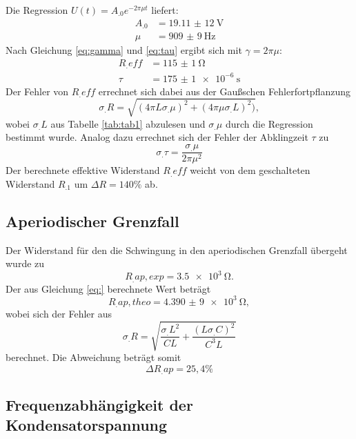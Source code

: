 \newpage
\noindent Die Regression $U(t)=A_.0e^{-2\pi\mu t}$ liefert:
\begin{align}
A_.0 &= \SI{19,11(12)}{\volt} \\
\mu &= \SI{909(9)}{\hertz}
\end{align}
Nach Gleichung \eqref{eq:gamma} und \eqref{eq:tau} ergibt sich mit $\gamma=2\pi\mu$:
\begin{align}
R_.{eff}&=\SI{115(1)}{\ohm} \\
\tau &=\SI{175(1)e-6}{\second}
\end{align}
Der Fehler von $R_.{eff}$ errechnet sich dabei aus der Gaußschen Fehlerfortpflanzung
\[
\sigma_.R=\sqrt{\left(4\pi L\sigma_.{\mu}\right)^2 +\left(4\pi\mu\sigma_.L\right)^2)},
\]
wobei $\sigma_.L$ aus Tabelle \ref{tab:tab1} abzulesen und $\sigma_.{\mu}$ durch die Regression bestimmt wurde.
Analog dazu errechnet sich der Fehler der Abklingzeit $\tau$ zu
\[
\sigma_.{\tau}=\frac{\sigma_.{\mu}}{2\pi\mu^2}
\]
Der berechnete effektive Widerstand $R_.{eff}$ weicht von dem geschalteten Widerstand $R_.1$ um $\Delta R=140\%$ ab.
\subsection{Aperiodischer Grenzfall}
Der Widerstand für den die Schwingung in den aperiodischen Grenzfall übergeht wurde zu
\[
R_.{ap,exp}=\SI{3,5e3}{\ohm}\text{.}
\]
Der aus Gleichung \eqref{eq:} berechnete Wert beträgt
\[
R_.{ap,theo}=\SI{4,390(9)e3}{\ohm},
\]
wobei sich der Fehler aus
\[
\sigma_.{R}=\sqrt{\frac{\sigma_.L^2}{CL}+\frac{\left(L\sigma_.C\right)^2}{C^3L}}
\]
berechnet.\newline
Die Abweichung beträgt somit
\[
\Delta R_.{ap}=25,4\%
\]
\subsection{Frequenzabhängigkeit der Kondensatorspannung}
